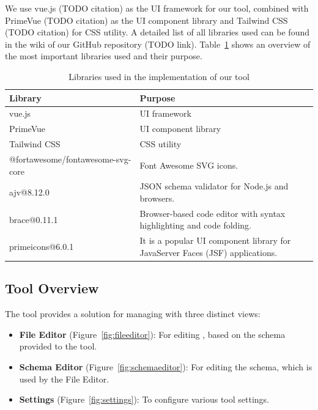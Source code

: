 We use vue.js (TODO citation) as the UI framework for our tool, combined with PrimeVue (TODO citation) as the UI component library and Tailwind CSS (TODO citation) for CSS utility.
A detailed list of all libraries used can be found in the wiki of our GitHub repository (TODO link).
Table~\ref{tab:libraries} shows an overview of the most important libraries used and their purpose.

\begin{table}[!hb] %
    \caption{Libraries used in the implementation of our tool} %
    \label{tab:libraries}
    \centering
    \begin{tabular}{ll}
        \toprule
        \textbf{Library} & \textbf{Purpose}     \\
        \midrule
        vue.js           & UI framework         \\
        PrimeVue         & UI component library \\
        Tailwind CSS     & CSS utility          \\
        @fortawesome/fontawesome-svg-core & Font Awesome SVG icons. \\
        ajv@8.12.0 & JSON schema validator for Node.js and browsers. \\
        brace@0.11.1 & Browser-based code editor with syntax highlighting and code folding. \\
        primeicons@6.0.1 & It is a popular UI component library for JavaServer Faces (JSF) applications. \\
        \bottomrule
    \end{tabular}
\end{table}

\subsection{Tool Overview}\label{subsec:tool-overview} %


The tool provides a solution for managing \cfgfiles{} with three distinct views:
\begin{itemize}
    \item \textbf{File Editor} (Figure~\ref{fig:fileeditor}): For editing \cfgfiles{}, based on the schema provided to the tool.
    \item \textbf{Schema Editor} (Figure~\ref{fig:schemaeditor}): For editing the schema, which is used by the File Editor.
    \item \textbf{Settings} (Figure~\ref{fig:settings}): To configure various tool settings.
\end{itemize}

